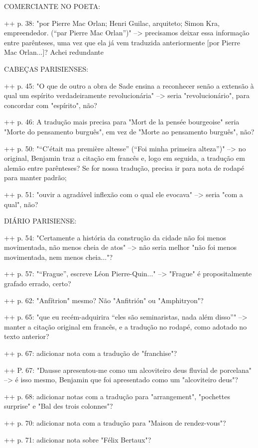 COMERCIANTE NO POETA:

++ p. 38: "por Pierre Mac Orlan; Henri Guilac, arquiteto; Simon Kra, empreendedor.
(“par Pierre Mac Orlan”)" --> precisamos deixar essa informação entre parênteses, uma vez que ela já vem traduzida anteriormente [por Pierre Mac Orlan...]? Achei redundante

CABEÇAS PARISIENSES:

++ p. 45: "O que de outro a obra de Sade ensina a reconhecer senão a extensão à qual um espírito verdadeiramente revolucionária" --> seria "revolucionário", para concordar com "espírito", não?

++ p. 46: A tradução mais precisa para "Mort de la pensée bourgeoise" seria "Morte do pensamento burguês", em vez de "Morte ao pensamento burguês", não?

++ p. 50: "“C’était ma première altesse” (“Foi minha primeira alteza”)" --> no original, Benjamin traz a citação em francês e, logo em seguida, a tradução em alemão entre parênteses? Se for nossa tradução, precisa ir para nota de rodapé para manter padrão;

++ p. 51: "ouvir a agradável inflexão com o qual ele evocava" --> seria "com a qual", não?

DIÁRIO PARISIENSE:

++ p. 54: "Certamente a história da construção da cidade não foi menos movimentada, não menos cheia de atos" --> não seria melhor "não foi menos movimentada, nem menos cheia..."?

++ p. 57: "“Frague”, escreve Léon Pierre-Quin..." --> "Frague" é propositalmente grafado errado, certo?

++ p. 62: "Anfítrion" mesmo? Não "Anfitrión" ou "Amphitryon"?

++ p. 65: "que eu recém-adquirira “eles são seminaristas, nada além disso”" --> manter a citação original em francês, e a tradução no rodapé, como adotado no texto anterior?


++ p. 67: adicionar nota com a tradução de "franchise"?

++ P. 67: "Dausse apresentou-me como um alcoviteiro deus fluvial de porcelana" --> é isso mesmo, Benjamin que foi apresentado como um "alcoviteiro deus"?

++ p. 68: adicionar notas com a tradução para "arrangement", "pochettes surprise" e "Bal des trois colonnes"?

++ p. 70: adicionar nota com a tradução para "Maison de rendez-vous"?

++ p. 71: adicionar nota sobre "Félix Bertaux"?

